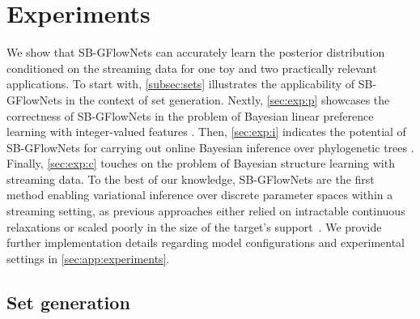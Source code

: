 \documentclass{article}
\theoremstyle{plain}
\theoremstyle{definition}
\theoremstyle{remark}
\theoremstyle{remark}
\begin{document}

\section{Experiments} \label{sec:experiments} 

We show that SB-GFlowNets can accurately learn the posterior distribution conditioned on the streaming data for one toy and two practically relevant applications. To start with, \autoref{subsec:sets} illustrates the applicability of SB-GFlowNets in the context of set generation.  
% 
Nextly, \autoref{sec:exp:p} showcases the correctness of SB-GFlowNets in the problem of Bayesian linear preference learning with integer-valued features \cite{Cole1993}. Then, \autoref{sec:exp:i} indicates the potential of SB-GFlowNets for carrying out online Bayesian inference over phylogenetic trees \cite{Dinh2017, Felsenstein1981, Yang2014}. 
Finally, \autoref{sec:exp:c} touches on the problem of Bayesian structure learning with streaming data. 
To the best of our knowledge, SB-GFlowNets are the first method enabling variational inference over discrete parameter spaces within a streaming setting, as previous approaches either relied on intractable continuous relaxations \cite{maddison2017the, jang2017categorical, han2020stein} or scaled poorly in the size of the target's support~\cite{wojnowicz2022easy}.  We provide further implementation details regarding model configurations and experimental settings in \autoref{sec:app:experiments}.

\subsection{Set generation} \label{subsec:sets} 
\end{document}
